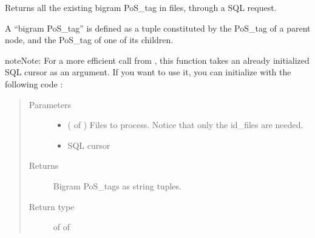\documentclass[letterpaper,10pt,english]{sphinxmanual}
\begin{document}

\begin{fulllineitems}
\label{\detokenize{analysis:loacore.analysis.frequencies.get_bigram_pos_tag_set}}
Returns all the existing bigram PoS\_tag in files, through a SQL request.

A “bigram PoS\_tag” is defined as a tuple constituted by the PoS\_tag of a parent node, and the PoS\_tag of one of its
children.

\begin{sphinxadmonition}{note}{Note:}
For a more efficient call from {\hyperref[\detokenize{analysis:loacore.analysis.frequencies.bigram_pos_tag_frequencies}]{}}, this function takes an already initialized SQL
cursor as an argument.
If you want to use it, you can initialize  with the following code :

%
\begin{sphinxVerbatim}[commandchars=\\\{\}]
   
   
  
  
\end{sphinxVerbatim}
\end{sphinxadmonition}
\begin{quote}\begin{description}
\item[{Parameters}] \leavevmode\begin{itemize}
\item {} 
 ( of ) \textendash{} Files to process. Notice that only the id\_files are needed.

\item {} 
 \textendash{} SQL cursor

\end{itemize}

\item[{Returns}] \leavevmode
Bigram PoS\_tags as string tuples.

\item[{Return type}] \leavevmode
{} of  of 

\end{description}\end{quote}

\end{fulllineitems}
\end{document}
